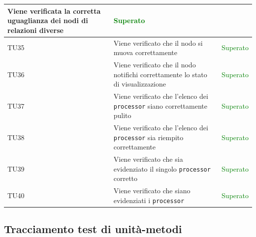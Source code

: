 \documentclass[openany,12pt,a4paper]{report}
\begin{document}
\begin{longtable}[c]{| p{2.5cm} |p{8cm} | p{2.5cm} |}
	\newline Viene verificata la corretta uguaglianza dei nodi di relazioni diverse&
	\newline \textcolor{green}{Superato}
	\\[1em]
	\hline
	\newline TU35&
	\newline Viene verificato che il nodo si muova correttamente&
	\newline \textcolor{green}{Superato}
	\\[1em]
	\hline
	\newline TU36&
	\newline Viene verificato che il nodo notifichi correttamente lo stato di visualizzazione&
	\newline \textcolor{green}{Superato}
	\\[1em]
	\hline
	\newline TU37&
	\newline Viene verificato che l'elenco dei \verb|processor| siano correttamente pulito&
	\newline \textcolor{green}{Superato}
	\\[1em]
	\hline
	\newline TU38&
	\newline Viene verificato che l'elenco dei \verb|processor| sia riempito correttamente&
	\newline \textcolor{green}{Superato}
	\\[1em]
	\hline
	\newline TU39&
	\newline Viene verificato che sia evidenziato il singolo \verb|processor| corretto&
	\newline \textcolor{green}{Superato}
	\\[1em]
	\hline
	\newline TU40&
	\newline Viene verificato che siano evidenziati i \verb|processor|&
	\newline \textcolor{green}{Superato}
	\\[1em]
	\hline
\end{longtable}

\subsection{Tracciamento test di unità-metodi}
\end{document}
